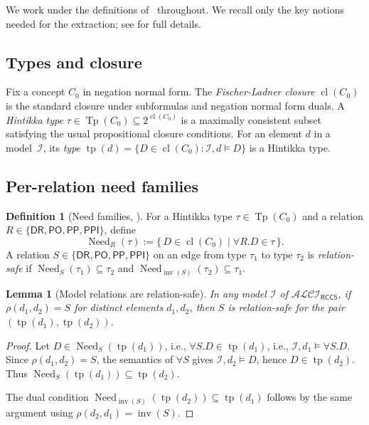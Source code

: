 \documentclass[11pt]{article}
\newtheorem{lemma}[theorem]{Lemma}
\theoremstyle{definition}
\newtheorem{definition}[theorem]{Definition}
\theoremstyle{remark}
\newcommand{\DR}{\mathsf{DR}}
\newcommand{\PO}{\mathsf{PO}}
\newcommand{\PP}{\mathsf{PP}}
\newcommand{\PPI}{\mathsf{PPI}}
\newcommand{\RCC}{\{\DR,\PO,\PP,\PPI\}}
\newcommand{\cl}{\operatorname{cl}}
\newcommand{\Tp}{\operatorname{Tp}}
\newcommand{\tp}{\operatorname{tp}}
\newcommand{\inv}{\operatorname{inv}}
\newcommand{\Need}{\operatorname{Need}}
\newcommand{\ALCIRCC}[1]{\mathcal{ALCI}_{\mathsf{RCC#1}}}
\begin{document}
We work under the definitions of~\cite{SplitForest} throughout.
We recall only the key notions needed for the extraction; see
\cite{SplitForest} for full details.

\subsection{Types and closure}

Fix a concept $C_0$ in negation normal form.  The \emph{Fischer-Ladner
closure} $\cl(C_0)$ is the standard closure under subformulas and
negation normal form duals.  A \emph{Hintikka type}
$\tau\in\Tp(C_0)\subseteq 2^{\cl(C_0)}$ is a maximally consistent
subset satisfying the usual propositional closure conditions.
For an element $d$ in a model~$\mathcal{I}$, its \emph{type}
$\tp(d)=\{D\in\cl(C_0):\mathcal{I},d\models D\}$ is a Hintikka type.

\subsection{Per-relation need families}

\begin{definition}[Need families, {\cite[Definition~1.4]{SplitForest}}]
\label{def:need}
For a Hintikka type $\tau\in\Tp(C_0)$ and a relation
$R\in\RCC$, define
\[
\Need_R(\tau) := \{\,D\in\cl(C_0) \mid \forall R.D\in\tau\,\}.
\]
A relation $S\in\RCC$ on an edge from type $\tau_1$ to type $\tau_2$
is \emph{relation-safe} if
$\Need_S(\tau_1)\subseteq\tau_2$ and
$\Need_{\inv(S)}(\tau_2)\subseteq\tau_1$.
\end{definition}

\begin{lemma}[Model relations are relation-safe]\label{lem:model-safe}
In any model $\mathcal{I}$ of $\ALCIRCC{5}$, if $\rho(d_1,d_2)=S$
for distinct elements $d_1,d_2$, then $S$ is relation-safe for the
pair $(\tp(d_1),\tp(d_2))$.
\end{lemma}

\begin{proof}
Let $D\in\Need_S(\tp(d_1))$, i.e., $\forall S.D\in\tp(d_1)$, i.e.,
$\mathcal{I},d_1\models\forall S.D$.  Since $\rho(d_1,d_2)=S$, the
semantics of $\forall S$ gives $\mathcal{I},d_2\models D$, hence
$D\in\tp(d_2)$.  Thus $\Need_S(\tp(d_1))\subseteq\tp(d_2)$.

The dual condition $\Need_{\inv(S)}(\tp(d_2))\subseteq\tp(d_1)$
follows by the same argument using $\rho(d_2,d_1)=\inv(S)$.
\end{proof}
\end{document}
